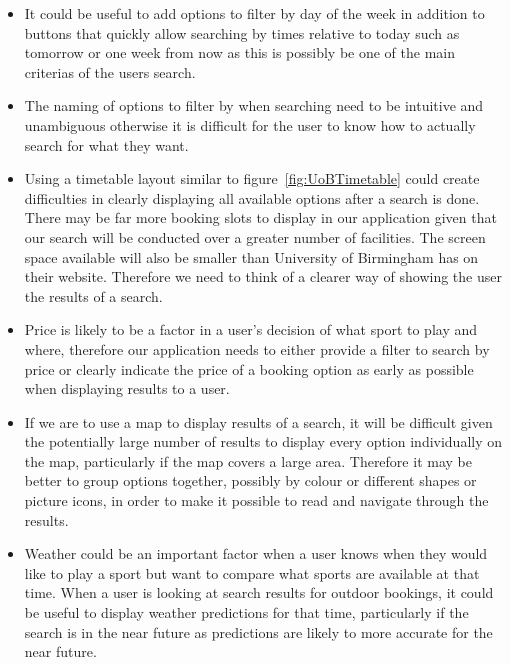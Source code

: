\begin{itemize}
	\item It could be useful to add options to filter by day of the week in
		addition to buttons that quickly allow searching by times relative to
		today such as tomorrow or one week from now as this is possibly be one
		of the main criterias of the users search.
	\item The naming of options to filter by when searching need to be
		intuitive and unambiguous otherwise it is difficult  for the user to
		know how to actually search for what they want.
	\item Using a timetable layout similar to figure~\ref{fig:UoBTimetable}
		could create difficulties in clearly displaying all available options
		after a search is done. There may be far more booking slots to display
		in our application given that our search will be conducted over a
		greater number of facilities. The screen space available will also be
		smaller than University of Birmingham has on their website. Therefore
		we need to think of a clearer way of showing the user the results of a
		search.
	\item Price is likely to be a factor in a user's decision of what sport to
		play and where, therefore our application needs to either provide a
		filter to search by price or clearly indicate the price of a booking
		option as early as possible when displaying results to a user.
	\item If we are to use a map to display results of a search, it will be
		difficult given the potentially large number of results to display
		every option individually on the map, particularly if the map covers a
		large area. Therefore it may be better to group options together,
		possibly by colour or different shapes or picture icons, in order to
		make it possible to read and navigate through the results.
	\item Weather could be an important factor when a user knows when they
		would like to play a sport but want to compare what sports are
		available at that time. When a user is looking at search results for
		outdoor bookings, it could be useful to display weather predictions for
		that time, particularly if the search is in the near future as
		predictions are likely to more accurate for the near future.
\end{itemize}
